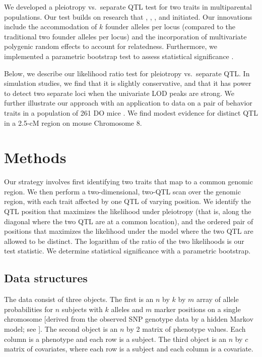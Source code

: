 \documentclass[oneside]{book}\usepackage[]{graphicx}\usepackage[]{color}
\begin{document}
We developed a pleiotropy vs.\ separate QTL test for two traits in
multiparental populations. Our test builds on research that
\citet{jiang1995multiple}, \citet{knott2000multitrait},
\citet{tian2016dissection}, and \citet{zhou2014efficient} initiated.
Our innovations include the accommodation of $k$ founder alleles per
locus (compared to the traditional two founder alleles per locus) and
the incorporation of multivariate polygenic random effects to account
for relatedness. Furthermore, we implemented a parametric bootstrap
test to assess statistical significance \citep{efron1979,tian2016dissection}.

Below, we describe our likelihood ratio test for pleiotropy vs.\
separate QTL. In simulation studies, we find that it is slightly
conservative, and that it has power to detect two separate loci when
the univariate LOD peaks are strong. We further illustrate our
approach with an application to data on a pair of behavior traits in
a population of 261 DO mice \citep{logan2013high,recla2014precise}.
We find modest evidence for distinct QTL in a 2.5-cM region on mouse
Chromosome 8.


\section{Methods}
\label{sec:materials:methods}

Our strategy involves first identifying two traits that map to a common
genomic region. We then perform a two-dimensional, two-QTL scan over
the genomic region, with each trait affected by one QTL of varying
position. We identify the QTL position that maximizes the likelihood
under pleiotropy (that is, along the diagonal where the two QTL are at
a common location), and the ordered pair of positions that maximizes
the likelihood under the model where the two QTL are allowed to be
distinct. The logarithm of the ratio of the two likelihoods is our
test statistic. We determine statistical significance with a parametric
bootstrap.

\subsection{Data structures}

The data consist of three objects. The first is an $n$ by $k$ by $m$
array of allele probabilities for $n$ subjects with $k$ alleles and
$m$ marker positions on a single chromosome [derived from the observed
SNP genotype data by a hidden Markov model; see
\citet{broman2019rqtl2}]. The second object is an $n$ by 2 matrix of
phenotype values. Each column is a phenotype and each row is a
subject. The third object is an $n$ by $c$ matrix of covariates, where
each row is a subject and each column is a covariate.
\end{document}
